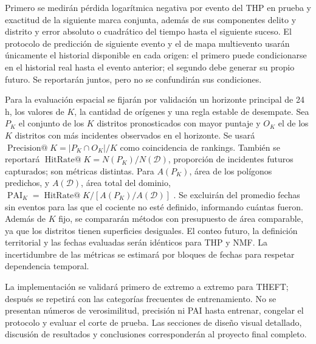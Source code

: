 \documentclass[10pt,a4paper,twocolumn]{article}
\begin{document}
Primero se medirán pérdida logarítmica negativa por evento del THP en prueba y exactitud de la siguiente marca conjunta, además de sus componentes delito y distrito y error absoluto o cuadrático del tiempo hasta el siguiente suceso. El protocolo de predicción de siguiente evento y el de mapa multievento usarán únicamente el historial disponible en cada origen: el primero puede condicionarse en el historial real hasta el evento anterior; el segundo debe generar su propio futuro. Se reportarán juntos, pero no se confundirán sus condiciones.

Para la evaluación espacial se fijarán por validación un horizonte principal de 24 h, los valores de $K$, la cantidad de orígenes y una regla estable de desempate. Sea $P_K$ el conjunto de los $K$ distritos pronosticados con mayor puntaje y $O_K$ el de los $K$ distritos con más incidentes observados en el horizonte. Se usará $\operatorname{Precision@}K=|P_K\cap O_K|/K$ como coincidencia de rankings. También se reportará $\operatorname{HitRate@}K=N(P_K)/N(\mathcal D)$, proporción de incidentes futuros capturados; son métricas distintas. Para $A(P_K)$, área de los polígonos predichos, y $A(\mathcal D)$, área total del dominio, $\operatorname{PAI}_K=\operatorname{HitRate@}K/[A(P_K)/A(\mathcal D)]$ \cite{chainey2008utility}. Se excluirán del promedio fechas sin eventos para las que el cociente no esté definido, informando cuántas fueron. Además de $K$ fijo, se compararán métodos con presupuesto de área comparable, ya que los distritos tienen superficies desiguales. El conteo futuro, la definición territorial y las fechas evaluadas serán idénticos para THP y NMF. La incertidumbre de las métricas se estimará por bloques de fechas para respetar dependencia temporal.

La implementación se validará primero de extremo a extremo para THEFT; después se repetirá con las categorías frecuentes de entrenamiento. No se presentan números de verosimilitud, precisión ni PAI hasta entrenar, congelar el protocolo y evaluar el corte de prueba. Las secciones de diseño visual detallado, discusión de resultados y conclusiones corresponderán al proyecto final completo.

\begingroup\small


\endgroup
\end{document}
